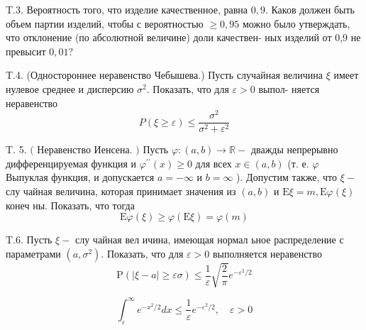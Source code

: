 \documentclass[a4paper,12pt]{article} %
\begin{document}
\begin{example}

T.3. 
Вероятность того, что изделие качественное, равна $0,9 .$ 
Каков должен быть объем партии изделий, чтобы с вероятностью $\geq 0,95$ можно было утверждать, что отклонение (по абсолютной величине) доли качествен-
ных изделий от 0,9 не превысит $0,01 ?$




\end{example}





\begin{example}


T.4. (Одностороннее неравенство Чебышева.) Пусть случайная величина $\xi$ имеет нулевое среднее и дисперсию $\sigma^{2} .$ Показать, что для $\varepsilon>0$ выпол-
няется неравенство
$$
P(\xi \geq \varepsilon) \leq \frac{\sigma^{2}}{\sigma^{2}+\varepsilon^{2}}
$$



\end{example}







\begin{example}


T. 5. $($ Неравенство Иенсена. $)$ Пусть $\varphi:(a, b) \rightarrow \mathbb{R}-$ дважды непрерывно дифференцируемая функция и $\varphi^{\prime \prime}(x) \geq 0$ для всех $x \in(a, b)$ (т. е. $\varphi$ Выпуклая функция, и допускается $a=-\infty$ и $b=\infty$ ). Допустим также, что $\xi-$ слу чайная величина, которая принимает значения из $(a, b)$ и $\mathrm{E} \xi=m, \mathrm{E} \varphi(\xi)$ конеч ны. Показать, что тогда
$$
\mathrm{E} \varphi(\xi) \geq \varphi(\mathrm{E} \xi)=\varphi(m)
$$



\end{example}



\begin{example}



T.6. Пусть $\xi-$ слу чайная вел ичина, имеющая нормал ьное распределение с параметрами $\left(a, \sigma^{2}\right) .$ Показать, что для $\varepsilon>0$ выполняется неравенство
$$
\mathrm{P}(|\xi-a| \geq \varepsilon \sigma) \leq \frac{1}{\varepsilon} \sqrt{\frac{2}{\pi}} e^{-\varepsilon^{2} / 2}
$$

$$\int_{\varepsilon}^{\infty} e^{-x^{2} / 2} d x \leq \frac{1}{\varepsilon} e^{-\varepsilon^{2} / 2}, \quad \varepsilon>0$$

\end{example}
\end{document}
